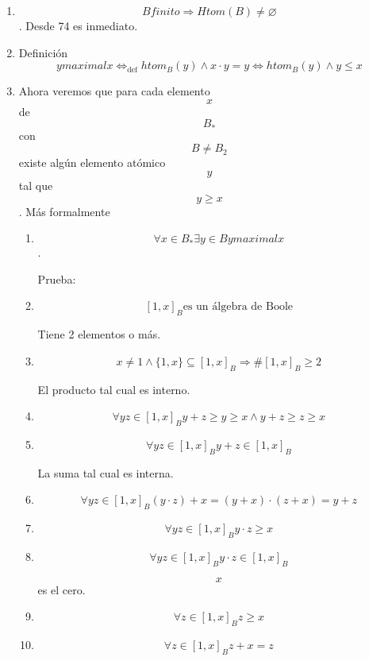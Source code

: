 \documentclass[
]{article}
\begin{document}
\begin{enumerate}
\begin{enumerate}
\begin{enumerate}
\begin{enumerate}
      \end{enumerate}
    \item
      \[B\mathit{finito}\Rightarrow\mathit{Htom}{{(B)} \neq \varnothing}\].
      Desde 74 es inmediato.
    \item
      Definición
      \[y\mathsf{\mathit{maximal}}x\Leftrightarrow_{\text{def}}\mathsf{\mathit{htom}}_{B}{{{{(y)} \land x} \cdot y} = y}\Leftrightarrow\mathsf{\mathit{htom}}_{B}{{{(y)} \land y} \leq x}\]
    \item
      Ahora veremos que para cada elemento \[x\] de \[B_{\ast}\] con
      \[B \neq B_{2}\] existe algún elemento atómico \[y\] tal que
      \[y \geq x\]. Más formalmente

      \begin{enumerate}
      \def\labelenumiv{\arabic{enumiv}.}
      \item
        \[\forall{x \in B_{\ast}}\exists{y \in B}y\mathsf{\mathit{maximal}}x\].

        Prueba:
      \item
        \[\left\lbrack {1,x} \right\rbrack_{B}\text{es un álgebra de Boole}\]

        Tiene 2 elementos o más.
      \item
        \[{{x \neq {1 \land {\{{1,x}\}}}} \subseteq \left\lbrack {1,x} \right\rbrack_{B}}\Rightarrow\#{\left\lbrack {1,x} \right\rbrack_{B} \geq 2}\]

        El producto tal cual es interno.
      \item
        \[\forall{\mathit{yz} \in \left\lbrack {1,x} \right\rbrack_{B}}{{{{{y + z} \geq y} \geq {{x \land y} + z}} \geq z} \geq x}\]
      \item
        \[\forall{\mathit{yz} \in \left\lbrack {1,x} \right\rbrack_{B}}{{y + z} \in \left\lbrack {1,x} \right\rbrack_{B}}\]

        La suma tal cual es interna.
      \item
        \[\forall{\mathit{yz} \in \left\lbrack {1,x} \right\rbrack_{B}}{{{{({y \cdot z})} + x} = {{({y + x})} \cdot {({z + x})}}} = {y + z}}\]
      \item
        \[\forall{\mathit{yz} \in \left\lbrack {1,x} \right\rbrack_{B}}{{y \cdot z} \geq x}\]
      \item
        \[\forall{\mathit{yz} \in \left\lbrack {1,x} \right\rbrack_{B}}{{y \cdot z} \in \left\lbrack {1,x} \right\rbrack_{B}}\]

        \[x\]es el cero.
      \item
        \[\forall{z \in \left\lbrack {1,x} \right\rbrack_{B}}{z \geq x}\]
      \item
        \[\forall{z \in \left\lbrack {1,x} \right\rbrack_{B}}{{z + x} = z}\]


\end{enumerate}
\end{enumerate}
\end{enumerate}
\end{enumerate}
\end{document}
